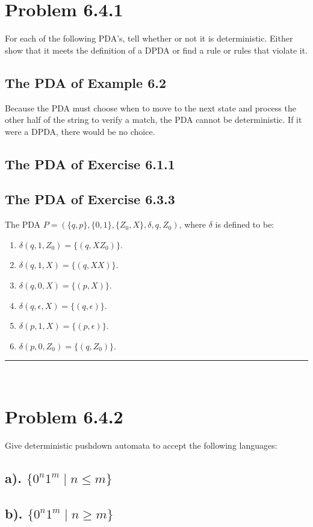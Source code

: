 \documentclass[20pt]{article} %
\begin{document}
\section{Problem 6.4.1}
For each of the following PDA's, tell whether or not it is deterministic.  Either show that it meets the definition of a DPDA or find a rule or rules that violate it.
\subsection{The PDA of Example 6.2}
Because the PDA must choose when to move to the next state and process the other half of the string to verify a match, the PDA cannot be deterministic. If it were a DPDA, there would be no choice.
\subsection{The PDA of Exercise 6.1.1}

\subsection{The PDA of Exercise 6.3.3}
The PDA $\!P = (\{q, p\}, \{0,1\}, \{Z_0,X\}, \delta, q , Z_0)$, where  $\delta$ is defined to be:
\begin{enumerate}
\item $\delta(q, 1, Z_0) = \{(q, XZ_0)\}$.
\item $\delta(q, 1, X) = \{(q, XX)\}$.
\item $\delta(q, 0, X) = \{(p, X)\}$.
\item $\delta(q, \epsilon, X) = \{(q, \epsilon)\}$.
\item $\delta(p, 1, X) = \{(p, \epsilon)\}$.
\item $\delta(p, 0, Z_0) = \{(q, Z_0)\}$.
\end{enumerate}
\noindent\rule{2cm}{0.4pt} \\

\section{Problem 6.4.2}
Give deterministic pushdown automata to accept the following languages:
\subsection{a). $\{0^{n}1^{m} \mid n \leq m\}$}
\subsection{b). $\{0^{n}1^{m} \mid n \geq m\}$}
\end{document}
